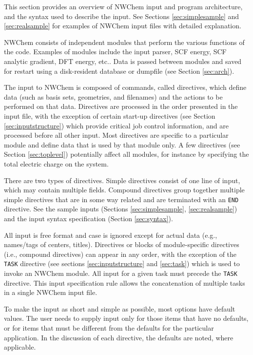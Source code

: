 %
%
\label{sec:getstart}

This section provides an overview of NWChem input and program
architecture, and the syntax used to describe the input.  See Sections
\ref{sec:simplesample} and \ref{sec:realsample} for examples of NWChem
input files with detailed explanation.

NWChem consists of independent modules that perform the various
functions of the code.  Examples of modules include the input parser,
SCF energy, SCF analytic gradient, DFT energy, etc..  Data is passed
between modules and saved for restart using a disk-resident database
or dumpfile (see Section \ref{sec:arch}).

The input to NWChem is composed of commands, called directives, which
define data (such as basis sets, geometries, and filenames) and the
actions to be performed on that data.  Directives are processed in the order
presented in the input file, with the exception of certain start-up
directives (see Section \ref{sec:inputstructure}) which provide
critical job control information, and are processed before all other
input.  Most directives are specific to a particular module and define
data that is used by that module only.  A few directives (see Section
\ref{sec:toplevel}) potentially affect all modules, for instance by
specifying the total electric charge on the system.    

There are two types of directives.  Simple directives consist of one
line of input, which may contain multiple fields.  Compound directives
group together multiple simple directives that are in some way
related and are terminated with an \verb+END+ directive.  See the
sample inputs (Sections \ref{sec:simplesample}, \ref{sec:realsample})
and the input syntax specification (Section \ref{sec:syntax}).

All input is free format and case is ignored except for actual data
(e.g., names/tags of centers, titles). Directives or blocks of
module-specific directives (i.e., compound directives) can appear in
any order, with the exception of the \verb+TASK+ directive (see
sections \ref{sec:inputstructure} and \ref{sec:task}) which is used to
invoke an NWChem module.  All input for a given task must
precede the \verb+TASK+ directive.  This input specification rule
allows the concatenation of multiple tasks in a single NWChem input
file. 

To make the input as short and simple as possible, most options have
default values.  The user needs to supply input only for those items that
have no defaults, or for items that must be different from the defaults
for the particular application.  In the discussion of each directive, the
defaults are noted, where applicable.

